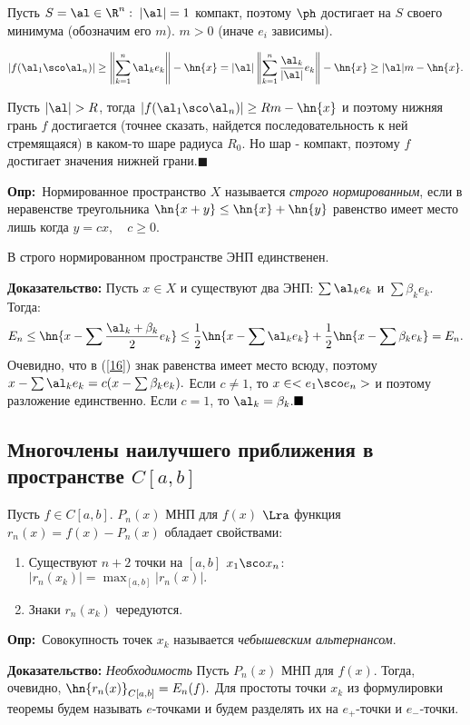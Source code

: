 \documentclass[a4paper]{article}
\def\defin{\noindent\textbf{Опр:}\ }
\begin{document}
Пусть $S={\al\in\R ^n:\;|\al|=1}$ компакт, поэтому
$\ph$ достигает на $S$ своего минимума (обозначим его $m$). $m>0$
(иначе $e_i$ зависимы).

$$|f(\al_1\sco \al_n)|\ge\left\|\sum_{k=1}^n \al_k
e_k\right\|-\hn{x}=|\al|\left\|\sum_{k=1}^n
\frac{\al_k}{|\al|} e_k\right\|-\hn{x}\ge|\al| m-\hn{x}.$$

Пусть $|\al|>R$, тогда $|f(\al_1\sco \al_n)|\ge
Rm-\hn{x}$ и поэтому нижняя грань $f$ достигается (точнее сказать,
найдется последовательность к ней стремящаяся) в каком-то шаре
радиуса $R_0$. Но шар - компакт, поэтому $f$ достигает значения
нижней грани.$\blacksquare$

\defin Нормированное пространство $X$ называется \emph{строго нормированным}, если в
неравенстве треугольника $\hn{x+y}\le\hn{x}+\hn{y}$ равенство имеет место лишь когда $y=cx, \quad c\ge0$.

\begin{theorems} В строго нормированном пространстве ЭНП
единственен.
\end{theorems}
\textbf{Доказательство:} Пусть $x\in X$ и существуют два ЭНП:
$\sum\al_k e_k$ и $\sum\beta_k e_k.$ Тогда:
\begin{equation}\label{16}
E_n\le\hn{x-\sum\frac{\al_k+\beta_k}2e_k}\le\frac12\hn{x-\sum\al_k e_k}+\frac12\hn{x-\sum\beta_k e_k}=E_n.
\end{equation}
Очевидно, что в (\ref{16}) знак равенства имеет место всюду,
поэтому $x-\sum\al_k e_k=c(x-\sum\beta_k e_k).$ Если $c\neq1$,
то $x\in<e_1\sco e_n>$ и поэтому разложение единственно. Если
$c=1$, то $\al_k=\beta_k.\blacksquare$

\subsection{Многочлены наилучшего приближения в пространстве $C[a,b]$}
\begin{theorems}[Чебышев]
Пусть $f\in C[a,b]$. $P_n(x)$ МНП для $f(x)$ $\Lra$
функция $r_n(x)=f(x)-P_n(x)$ обладает свойствами:
\begin{enumerate}
\item
Существуют $n+2$ точки на $[a,b]$ $x_1\sco x_n$:
$|r_n(x_k)|=\max_{[a,b]}|r_n(x)|.$
\item
Знаки $r_n(x_k)$ чередуются.
\end{enumerate}
\end{theorems}
\defin Совокупность точек $x_k$ называется
\emph{чебышевским альтернансом}.

\medskip\noindent\textbf{Доказательство:} \emph{Необходимость}
Пусть $P_n(x)$ МНП для $f(x)$. Тогда, очевидно,
$\hn{r_n(x)}_{C[a,b]}=E_n(f).$ Для простоты точки $x_k$ из
формулировки теоремы будем называть $e$-точками и будем разделять
их на $e_+$-точки и $e_-$-точки.
\end{document}

